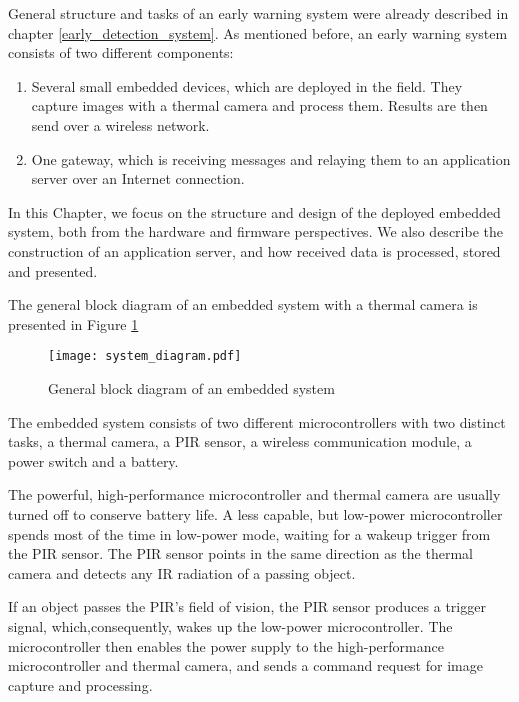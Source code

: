 General structure and tasks of an early warning system were already described in chapter \ref{early_detection_system}.
As mentioned before, an early warning system consists of two different components:

\begin{enumerate} 
    \item Several small embedded devices, which are deployed in the field. They capture images with a thermal camera and process them. Results are then send over a wireless network.
    \item One gateway, which is receiving messages and relaying them to an application server over an Internet connection.
\end{enumerate} 

In this Chapter, we focus on the structure and design of the deployed embedded system, both from the hardware and firmware perspectives.
We also describe the construction of an application server, and how received data is processed, stored and presented.

The general block diagram of an embedded system with a thermal camera is presented in Figure \ref{system_diagram} 

\begin{figure}[ht]
        \centering
        \texttt{[image: system\_diagram.pdf]} 
        \caption{ General block diagram of an embedded system}
        \label{system_diagram}
\end{figure}

The embedded system consists of two different microcontrollers with two distinct tasks, a thermal camera, a PIR sensor, a wireless communication module, a power switch and a battery.

The powerful, high-performance microcontroller and thermal camera are usually turned off to conserve battery life.
A less capable, but low-power microcontroller spends most of the time in low-power mode, waiting for a wakeup trigger from the PIR sensor.
The PIR sensor points in the same direction as the thermal camera and detects any IR radiation of a passing object.

If an object passes the PIR's field of vision, the PIR sensor produces a trigger signal, which,consequently, wakes up the low-power microcontroller.
The microcontroller then enables the power supply to the high-performance microcontroller and thermal camera, and sends a command request for image capture and processing.

